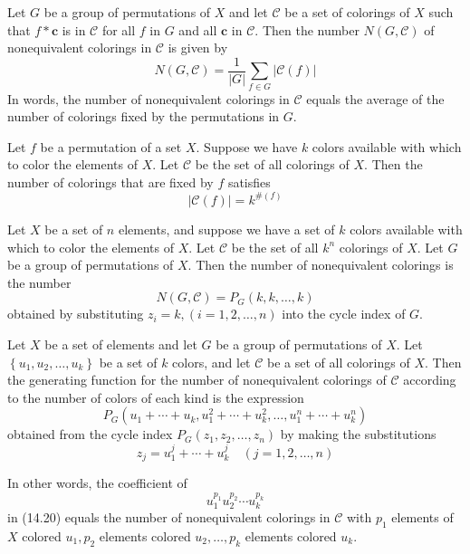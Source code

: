 \begin{theorem}
  \label{thm:14.2.3}
  Let $G$ be a group of permutations of $X$ and let $\mathcal{C}$ be a set of colorings of $X$ such that $f * \mathbf{c}$ is in $\mathcal{C}$ for all $f$ in $G$ and all $\mathbf{c}$ in $\mathcal{C}$. Then the number $N(G, \mathcal{C})$ of nonequivalent colorings in $\mathcal{C}$ is given by
  \begin{equation}\label{14.7}
    N(G, \mathcal{C})=\frac{1}{|G|} \sum_{f \in G}|\mathcal{C}(f)|
  \end{equation}
  In words, the number of nonequivalent colorings in $\mathcal{C}$ equals the average of the number of colorings fixed by the permutations in $G$.   
\end{theorem}

\begin{theorem}
  \label{thm:14.3.1}
  Let $f$ be a permutation of a set $X$. Suppose we have $k$ colors available with which to color the elements of $X$. Let $\mathcal{C}$ be the set of all colorings of $X$. Then the number of colorings that are fixed by $f$ satisfies
  $$
  |\mathcal{C}(f)|=k^{\#(f)}
  $$
\end{theorem}

\begin{theorem}
  \label{thm:14.3.2}
  Let $X$ be a set of $n$ elements, and suppose we have a set of $k$ colors available with which to color the elements of $X$. Let $\mathcal{C}$ be the set of all $k^n$ colorings of $X$. Let $G$ be a group of permutations of $X$. Then the number of nonequivalent colorings is the number
  $$
  N(G, \mathcal{C})=P_G(k, k, \ldots, k)
  $$
  obtained by substituting $z_i=k,(i=1,2, \ldots, n)$ into the cycle index of $G$.
\end{theorem}

\begin{theorem}
  \label{thm:14.3.3}
  Let $X$ be a set of elements and let $G$ be a group of permutations of $X$. Let $\left\{u_1, u_2, \ldots, u_k\right\}$ be a set of $k$ colors, and let $\mathcal{C}$ be a set of all colorings of $X$. Then the generating function for the number of nonequivalent colorings of $\mathcal{C}$ according to the number of colors of each kind is the expression
  \begin{equation}\label{14.20}
    P_G\left(u_1+\cdots+u_k, u_1^2+\cdots+u_k^2, \ldots, u_1^n+\cdots+u_k^n\right)
  \end{equation}
  obtained from the cycle index $P_G\left(z_1, z_2, \ldots, z_n\right)$ by making the substitutions
  $$
  z_j=u_1^j+\cdots+u_k^j \quad(j=1,2, \ldots, n)
  $$

  In other words, the coefficient of
  $$
  u_1^{p_1} u_2^{p_2} \cdots u_k^{p_k}
  $$
  in (14.20) equals the number of nonequivalent colorings in $\mathcal{C}$ with $p_1$ elements of $X$ colored $u_1, p_2$ elements colored $u_2, \ldots, p_k$ elements colored $u_k$.
\end{theorem}


















